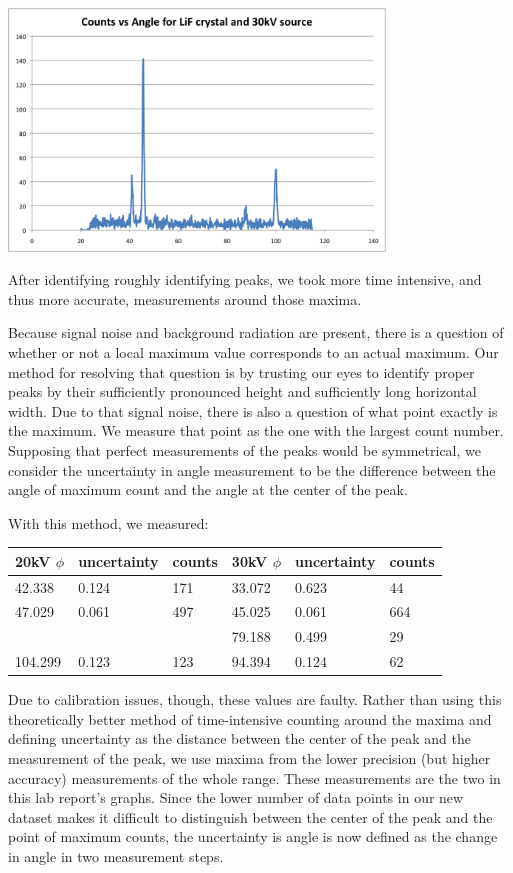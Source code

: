\documentclass{article}
\begin{document}
\includegraphics[width=10cm]{images/LiF30kV}


After identifying roughly identifying peaks, we took more time intensive, and thus more accurate, measurements around those maxima.

Because signal noise and background radiation are present, there is a question of whether or not a local maximum value corresponds to an actual maximum. Our method for resolving that question is by trusting our eyes to identify proper peaks by their sufficiently pronounced height and sufficiently long horizontal width. Due to that signal noise, there is also a question of what point exactly is the maximum. We measure that point as the one with the largest count number. Supposing that perfect measurements of the peaks would be symmetrical, we consider the uncertainty in angle measurement to be the difference between the angle of maximum count and the angle at the center of the peak.  

With this method, we measured:

\begin{tabular}{| l | l | l | l | l | l |}
\hline
20kV $\phi$ & uncertainty & counts & 30kV $\phi$ & uncertainty & counts \\
\hline
42.338 & 0.124 & 171 & 33.072 & 0.623 & 44 \\
\hline
47.029 & 0.061 & 497 & 45.025 & 0.061 & 664 \\
\hline
& & & 79.188 & 0.499 & 29 \\
\hline
104.299 & 0.123 & 123 & 94.394 & 0.124 & 62 \\
\hline
\end{tabular}

Due to calibration issues, though, these values are faulty. Rather than using this theoretically better method of time-intensive counting around the maxima and defining uncertainty as the distance between the center of the peak and the measurement of the peak, we use maxima from the lower precision (but higher accuracy) measurements of the whole range. These measurements are the two in this lab report's graphs. Since the lower number of data points in our new dataset makes it difficult to distinguish between the center of the peak and the point of maximum counts, the uncertainty is angle is now defined as the change in angle in two measurement steps.
\end{document}
